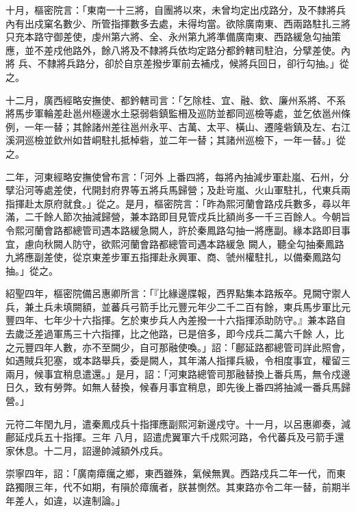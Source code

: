 \begin{pinyinscope}
 十月，樞密院言：「東南一十三將，自團將以來，未曾均定出戍路分，及不隸將兵內有出戍窠名數少、所管指揮數多去處，未得均當。欲除廣南東、西兩路駐扎三將只充本路守御差使，虔州第六將、全、永州第九將準備廣南東、西路緩急勾抽策應，並不差戍他路外，餘八將及不隸將兵依均定路分都鈐轄司駐泊，分擘差使。內將
 兵、不隸將兵路分，卻於自京差撥步軍前去補戍，候將兵回日，卻行勾抽。」從之。



 十二月，廣西經略安撫使、都鈐轄司言：「乞除桂、宜、融、欽、廉州系將、不系將馬步軍輪差赴邕州極邊水土惡弱砦鎮監柵及巡防並都同巡檢等處，並乞依邕州條例，一年一替；其餘諸州差往邕州永平、古萬、太平、橫山、遷隆砦鎮及左、右江溪洞巡檢並欽州如昔峒駐扎抵棹砦，並二年一替；其諸州巡檢下，一年一替。」從之。



 二年，河東經略安撫使曾布言：「河外
 上番四將，每將內抽減步軍赴嵐、石州，分擘沿河等處差使，代開封府界等五將兵馬歸營；及赴岢嵐、火山軍駐扎，代東兵兩指揮赴太原府就食。」從之。是月，樞密院言：「昨為熙河蘭會路戍兵數多，尋以年滿，二千餘人節次抽減歸營，兼本路即目見管戍兵比額尚多一千三百餘人。今朝旨令熙河蘭會路都總管司遇本路緩急闕人，許於秦鳳路勾抽一將應副。緣本路即目事宜，慮向秋闕人防守，欲熙河蘭會路都總管司遇本路緩急
 闕人，聽全勾抽秦鳳路九將應副差使，從京東差步軍五指揮赴永興軍、商、虢州權駐扎，以備秦鳳路勾抽。」從之。



 紹聖四年，樞密院備呂惠卿所言：「『比緣邊牒報，西界點集本路叛卒。見闕守禦人兵，兼土兵未填闕額，並蕃兵弓箭手比元豐元年少二千二百有餘，東兵馬步軍比元豐四年、七年少十六指揮。乞於東步兵人內差撥一十六指揮添助防守。』兼本路自去歲泛差過軍馬三十六指揮，比之他路，已是倍多，即今戍兵二萬六千餘
 人，比之元豐四年人數，亦不至闕少，自可那融使喚。」詔：「鄜延路都總管司詳此照會，如遇賊兵犯塞，或本路舉兵，委是闕人，其年滿人指揮兵級，令相度事宜，權留三兩月，候事宜稍息遣還。」是月，詔：「河東路總管司那融替換上番兵馬，無令戍邊日久，致有勞弊。如無人替換，候春月事宜稍息，即先後上番四將抽減一番兵馬歸營。」



 元符二年閏九月，遣秦鳳戍兵十指揮應副熙河新邊戍守。十一月，以呂惠卿奏，減鄜延戍兵五十指揮。三年
 八月，詔遣虎翼軍六千戍熙河路，令代蕃兵及弓箭手還家休息。十二月，詔邊帥減額外戍兵。



 崇寧四年，詔：「廣南瘴癘之鄉，東西雖殊，氣候無異。西路戍兵二年一代，而東路獨限三年，代不如期，有隕於瘴癘者，朕甚惻然。其東路亦令二年一替，前期半年差人，如違，以違制論。」




\end{pinyinscope}
